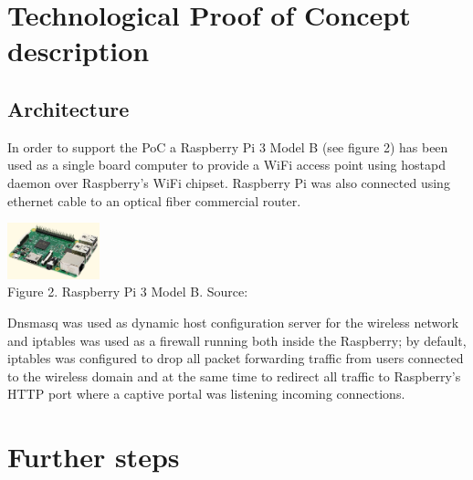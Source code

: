 \documentclass[12pt]{amsart}
\begin{document}
\begin{multicols}{2}
\section{Technological Proof of Concept description}

\subsection{Architecture}
\label{ch:architecture}
\vspace{0.35cm}

In order to support the PoC a
Raspberry Pi 3 Model B (see figure 2) has been used
as a single board computer to provide a WiFi access point using
hostapd\cite{hostapd} daemon over Raspberry's WiFi chipset.
Raspberry Pi was also connected using ethernet cable
to an optical fiber commercial router.

\begin{center}
  \includegraphics[keepaspectratio, width=0.2\textwidth]{images/rpi3modelb-sourceamazon.eps}
\\
Figure 2. Raspberry Pi 3 Model B. Source: \cite{RaspberryPi3}
\\
\end{center}

\vspace{0.35cm}

Dnsmasq\cite{dnsmasq} was used
as dynamic host configuration server for the wireless
network and
iptables\cite{iptables} was used as a firewall running
both inside the Raspberry; by default, iptables
was configured to
drop all packet
forwarding traffic from users connected to the wireless
domain and at the same time to redirect all
traffic to Raspberry's HTTP port where a
captive portal was listening incoming connections.








\section{Further steps}

\end{multicols}
\end{document}
